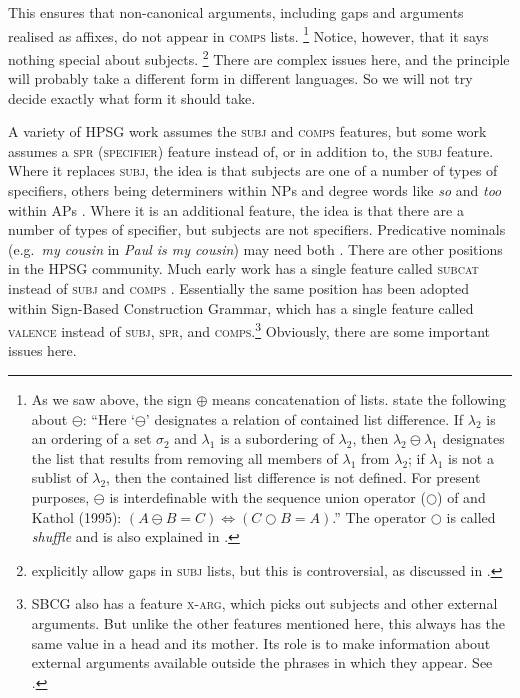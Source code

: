 \documentclass[output=paper,biblatex,babelshorthands,newtxmath,draftmode,colorlinks,citecolor=brown]{langscibook}
\begin{document}
\noindent
This ensures that non-canonical arguments, including gaps and arguments realised as affixes, do not appear in \textsc{comps} lists.%
%
\footnote{\label{fn-shuffle}As we saw above, the sign $\oplus$ means concatenation of lists. \citet[]{GSag2000a-u} state the
  following about $\ominus$: ``Here `$\ominus$' designates a relation of contained list difference. If
$\lambda_2$ is an ordering of a set $\sigma_2$ and $\lambda_1$ is a subordering of $\lambda_2$, then
$\lambda_2 \ominus \lambda_1$ designates the list that results from removing all members of
$\lambda_1$ from $\lambda_2$; if $\lambda_1$ is not a sublist of $\lambda_2$, then the contained
list difference is not defined. For present purposes, $\ominus$ is interdefinable with the sequence
union operator ($\bigcirc$\is{$\bigcirc$}) of
\citet{Reape94a} and Kathol (1995): $(A \ominus B = C) \Leftrightarrow (C \bigcirc B = A)$.'' The
operator $\bigcirc$ is called \emph{shuffle} and is also explained in \crossrefchapterw[\page \pageref{rel-shuffle}]{order}.}
%
Notice, however, that it says nothing special about subjects.%
%
\footnote{\citet[177--183]{GSag2000a-u} explicitly allow gaps in \textsc{subj} lists, but this is
  controversial, as discussed in \crossrefchapterw[\page
  \pageref{udc:page-subject-gaps-start}--\pageref{udc:page-subject-gaps-end}]{udc}.}
%
There are complex issues here, and the principle will probably take a different form in different languages. So we will not try decide exactly what form it should take.

A variety of HPSG work assumes the \textsc{subj} and \textsc{comps} features, but some work assumes
a \textsc{spr (specifier)} feature instead of, or in addition to, the \textsc{subj} feature. Where it
replaces \textsc{subj}, the idea is that subjects are one of a number of types of specifiers, others
being determiners within NPs and degree words like \emph{so} and \emph{too} within APs
\citep[]{ps2}. Where it is an additional feature, the idea is that there are a number of
types of specifier, but subjects are not specifiers. Predicative nominals (e.g.\ \emph{my cousin} in
\emph{Paul is my cousin}) may need both
\parencites[Section~9.4.1]{ps2}[409]{GSag2000a-u}{AG2003b-u}. There are other positions in the HPSG 
community. Much early work has a single feature called \textsc{subcat}
instead of \textsc{subj} and \textsc{comps} \citep{ps}. Essentially the same position has been
adopted within Sign-Based Construction Grammar, which has a single feature called \textsc{valence}
instead of \textsc{subj}, \textsc{spr}, and \textsc{comps}.\footnote{%
  SBCG also has a feature \textsc{x-arg}, which picks out subjects and other external arguments. But
  unlike the other features mentioned here, this always has the same value in a head and its
  mother. Its role is to make information about external arguments available outside the phrases in
  which they appear.  See \citet[84, 149--151]{Sag2007a,Sag2012a}.} 
%
Obviously, there are some important issues here.
\end{document}
